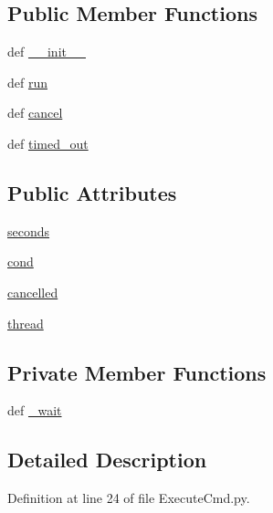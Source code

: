 \subsection*{Public Member Functions}
\begin{DoxyCompactItemize}
\item 
def \hyperlink{class_execute_cmd_1_1_timeout_thread_a9cd172ea1ce1f70bbdc71887be8de39b}{\-\_\-\-\_\-init\-\_\-\-\_\-}
\item 
def \hyperlink{class_execute_cmd_1_1_timeout_thread_a34f25443aac6dd070280eb7bad9bdba9}{run}
\item 
def \hyperlink{class_execute_cmd_1_1_timeout_thread_a991eb5d4f19ca7372f91b37be29924e5}{cancel}
\item 
def \hyperlink{class_execute_cmd_1_1_timeout_thread_a6de9f7a7e3d06d1c7c0f85f2b384b869}{timed\-\_\-out}
\end{DoxyCompactItemize}
\subsection*{Public Attributes}
\begin{DoxyCompactItemize}
\item 
\hyperlink{class_execute_cmd_1_1_timeout_thread_a93a3a333cc928cf7009ace5b8b568722}{seconds}
\item 
\hyperlink{class_execute_cmd_1_1_timeout_thread_ac654287e1bf651a90f45dd968e9d3c76}{cond}
\item 
\hyperlink{class_execute_cmd_1_1_timeout_thread_a134678f5a58c2493e0dd63f6264caacd}{cancelled}
\item 
\hyperlink{class_execute_cmd_1_1_timeout_thread_ae8c4ccc5d51f3383f5e53c556f27cc7a}{thread}
\end{DoxyCompactItemize}
\subsection*{Private Member Functions}
\begin{DoxyCompactItemize}
\item 
def \hyperlink{class_execute_cmd_1_1_timeout_thread_af046d96f23b1aafca10c9c8ae695255e}{\-\_\-wait}
\end{DoxyCompactItemize}


\subsection{Detailed Description}


Definition at line 24 of file Execute\-Cmd.\-py.



